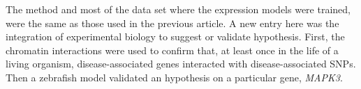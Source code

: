 \documentclass[../main.tex]{subfiles}
\begin{document}
The method and most of the data set where the expression models were 
trained, were the same as those used in the previous article. A new 
entry here was the integration of experimental biology to suggest or 
validate hypothesis. First, the chromatin interactions were used to 
confirm that, at least once in the life of a living organism, 
disease-associated genes interacted with disease-associated SNPs. Then a 
zebrafish model validated an hypothesis on a particular gene, 
\textit{MAPK3}.
\end{document}
